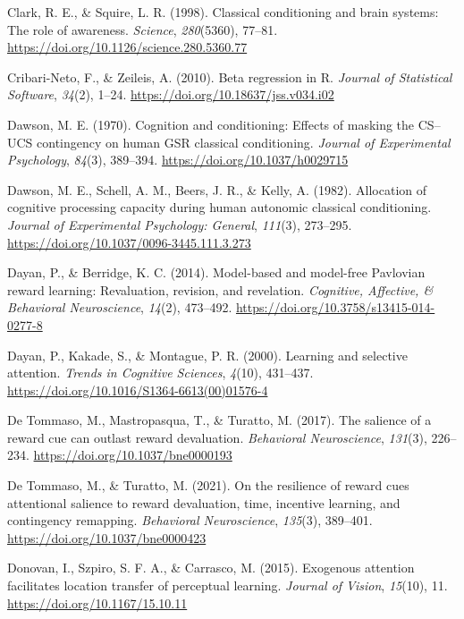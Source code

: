 \documentclass[
  man,
  floatsintext,
  longtable,
  nolmodern,
  notxfonts,
  notimes,
  mask,
  colorlinks=true,linkcolor=blue,citecolor=blue,urlcolor=blue]{apa7}
\newlength{\cslhangindent}
\newenvironment{CSLReferences}[2] %
 {\begin{list}{}{%
  \setlength{\itemindent}{0pt}
  \setlength{\leftmargin}{0pt}
  \setlength{\parsep}{0pt}
  \ifodd #1
   \setlength{\leftmargin}{\cslhangindent}
   \setlength{\itemindent}{-1\cslhangindent}
  \fi
  \setlength{\itemsep}{#2\baselineskip}}}
 {\end{list}}
\begin{document}
\begin{CSLReferences}{1}{0}
Clark, R. E., \& Squire, L. R. (1998). Classical conditioning and brain
systems: The role of awareness. \emph{Science}, \emph{280}(5360),
77--81. \url{https://doi.org/10.1126/science.280.5360.77}

Cribari-Neto, F., \& Zeileis, A. (2010). Beta regression in {R}.
\emph{Journal of Statistical Software}, \emph{34}(2), 1--24.
\url{https://doi.org/10.18637/jss.v034.i02}

Dawson, M. E. (1970). Cognition and conditioning: Effects of masking the
{CS}--{UCS} contingency on human {GSR} classical conditioning.
\emph{Journal of Experimental Psychology}, \emph{84}(3), 389--394.
\url{https://doi.org/10.1037/h0029715}

Dawson, M. E., Schell, A. M., Beers, J. R., \& Kelly, A. (1982).
Allocation of cognitive processing capacity during human autonomic
classical conditioning. \emph{Journal of Experimental Psychology:
General}, \emph{111}(3), 273--295.
\url{https://doi.org/10.1037/0096-3445.111.3.273}

Dayan, P., \& Berridge, K. C. (2014). Model-based and model-free
Pavlovian reward learning: Revaluation, revision, and revelation.
\emph{Cognitive, Affective, \& Behavioral Neuroscience}, \emph{14}(2),
473--492. \url{https://doi.org/10.3758/s13415-014-0277-8}

Dayan, P., Kakade, S., \& Montague, P. R. (2000). Learning and selective
attention. \emph{Trends in Cognitive Sciences}, \emph{4}(10), 431--437.
\url{https://doi.org/10.1016/S1364-6613(00)01576-4}

De Tommaso, M., Mastropasqua, T., \& Turatto, M. (2017). The salience of
a reward cue can outlast reward devaluation. \emph{Behavioral
Neuroscience}, \emph{131}(3), 226--234.
\url{https://doi.org/10.1037/bne0000193}

De Tommaso, M., \& Turatto, M. (2021). On the resilience of reward cues
attentional salience to reward devaluation, time, incentive learning,
and contingency remapping. \emph{Behavioral Neuroscience},
\emph{135}(3), 389--401. \url{https://doi.org/10.1037/bne0000423}

Donovan, I., Szpiro, S. F. A., \& Carrasco, M. (2015). Exogenous
attention facilitates location transfer of perceptual learning.
\emph{Journal of Vision}, \emph{15}(10), 11.
\url{https://doi.org/10.1167/15.10.11}


\end{CSLReferences}
\end{document}

